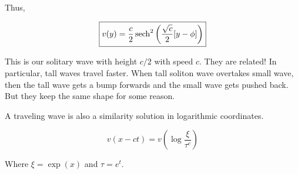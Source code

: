 \documentclass{article}
\newtheorem{one minute paper}[theorem]{One Minute Paper}
\begin{document}
Thus, 

\begin{equation}
    \boxed{v(y) = \frac{c}{2}\sech^2\left( \frac{\sqrt{c}}{2}[y - \phi] \right)}
\end{equation}

This is our solitary wave with height $c/2$ with speed $c$. They are related! In particular, tall waves travel faster. When tall soliton 
wave overtakes small wave, then the tall wave gets a bump forwards and the small wave gets pushed back. But they keep the same shape for some reason. 

A traveling wave is also a similarity solution in logarithmic coordinates. 

\begin{equation}
    v(x - ct) = v\left( \log \frac{\xi}{\tau^c} \right) 
\end{equation}

Where $\xi = \exp(x)$ and $\tau = e^{t}$. 
\end{document}
